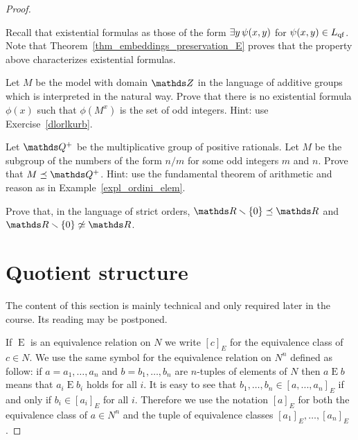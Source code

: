 \begin{proof}
\begin{exercise}
Recall that existential formulas as those of the form $\exists y\,\psi(x,y)$ for $\psi(x,y)\in L_{\rm qf}$.
Note that Theorem~\ref{thm_embeddings_preservation_E} proves that the property above characterizes existential formulas.

\end{exercise}

\begin{exercise}\label{ex_Z_odd_existential}
Let $M$ be the model with domain $\ZZ$ in the language of additive groups which is interpreted in the natural way.
Prove that there is no existential formula $\phi(x)$ such that $\phi(M^x)$ is the set of odd integers.
Hint: use Exercise~\ref{dlorlkurb}.
\end{exercise}


\begin{exercise}\label{ex_Q_odd}
Let $\QQ^+$ be the multiplicative group of positive rationals.
Let $M$ be the subgroup of the numbers of the form $n/m$ for some odd integers $m$ and $n$.
Prove that $M\preceq\QQ^+$.
Hint: use the fundamental theorem of arithmetic and reason as in Example~\ref{expl_ordini_elem}.
\end{exercise}

\begin{exercise} 
  Prove that, in the language of strict orders, $\RR\sm\{0\}\preceq \RR$ and $\RR\sm\{0\}\not\simeq \RR$.
\end{exercise}
  
\section{Quotient structure}\label{quotient}
\def\ceq#1#2#3{\parbox[b]{20ex}{$\displaystyle #1$}\parbox[b]{6ex}{\hfil$#2$}$\displaystyle #3$}

The content of this section is mainly technical and only required later in the course.
Its reading may be postponed.


If $\mathrel{E}$ is an equivalence relation on $N$ we write \emph{$[c]_E$\/} for the equivalence class of $c\in N$.
We use the same symbol for the equivalence relation on $N^n$ defined as follow: if $a=a_1,\dots,a_n$ and $b=b_1,\dots,b_n$ are $n$-tuples of elements of $N$ then \emph{$a\mathrel{E} b$\/} means that  $a_i\mathrel{E} b_i$ holds for all $i$.
It is easy to see that $b_1,\dots,b_n\in [a, ..., a_n]_E$ if and only if $b_i \in [a_i]_E$ for all $i$.
 Therefore we use the notation \emph{$[a]_E$\/} for both the equivalence class of $a\in N^n$ and the tuple of equivalence classes $[a_1]_E,\dots,[a_n]_E$.


\end{proof}
